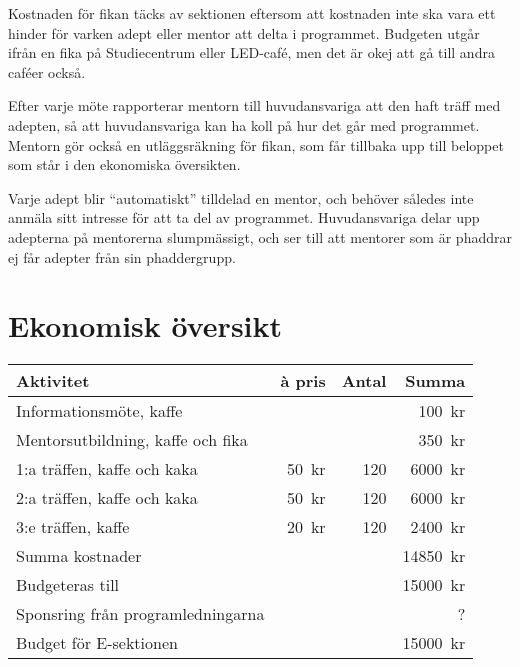 \documentclass[10pt]{article}
\begin{document}
    Kostnaden för fikan täcks av sektionen eftersom att kostnaden inte ska vara ett hinder för varken adept eller mentor att delta i programmet.
    Budgeten utgår ifrån en fika på Studiecentrum eller LED-café, men det är okej att gå till andra caféer också.

    Efter varje möte rapporterar mentorn till huvudansvariga att den haft träff med adepten, så att huvudansvariga kan ha koll på hur det går med programmet.
    Mentorn gör också en utläggsräkning för fikan, som får tillbaka upp till beloppet som står i den ekonomiska översikten.

    Varje adept blir ``automatiskt'' tilldelad en mentor, och behöver således inte anmäla sitt intresse för att ta del av programmet.
    Huvudansvariga delar upp adepterna på mentorerna slumpmässigt, och ser till att mentorer som är phaddrar ej får adepter från sin phaddergrupp.

    \newpage

    \section{Ekonomisk översikt}
    \begin{tabularx}{\textwidth}{Xrrr}
        \textbf{Aktivitet} & \textbf{\`a pris} & \textbf{Antal} & \textbf{Summa} \\
        \hline
        Informationsmöte, kaffe & & & \SI{100}{kr} \\
        Mentorsutbildning, kaffe och fika & & & \SI{350}{kr} \\
        1:a träffen, kaffe och kaka & \SI{50}{kr} & 120 & \SI{6000}{kr} \\
        2:a träffen, kaffe och kaka & \SI{50}{kr} & 120 & \SI{6000}{kr} \\
        3:e träffen, kaffe & \SI{20}{kr} & 120 & \SI{2400}{kr} \\
        \hline
        Summa kostnader & & & \SI{14850}{kr}\\
        Budgeteras till & & & \SI{15000}{kr}\\
        Sponsring från programledningarna & & & ? \\
        \hline
        Budget för E-sektionen & & & \SI{15000}{kr} \\
    \end{tabularx}

    \vspace*{\baselineskip}
\end{document}
